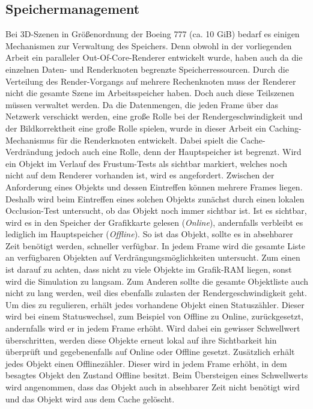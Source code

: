 \subsection{Speichermanagement}
\label{sec:basics:speicher}
Bei 3D-Szenen in Größenordnung der Boeing 777 (ca. 10 GiB) bedarf es einigen Mechanismen zur Verwaltung des Speichers. Denn obwohl in der vorliegenden Arbeit ein paralleler Out-Of-Core-Renderer entwickelt wurde, haben auch da die einzelnen Daten- und Renderknoten begrenzte Speicherressourcen. Durch die Verteilung des Render-Vorgangs auf mehrere Rechenknoten muss der Renderer nicht die gesamte Szene im Arbeitsspeicher haben. Doch auch diese Teilszenen müssen verwaltet werden. Da die Datenmengen, die jeden Frame über das Netzwerk verschickt werden, eine große Rolle bei der Rendergeschwindigkeit und der Bildkorrektheit eine große Rolle spielen, wurde in dieser Arbeit ein Caching-Mechanismus für die Renderknoten entwickelt. Dabei spielt die Cache-Verdrändung jedoch auch eine Rolle, denn der Hauptspeicher ist begrenzt. Wird ein Objekt im Verlauf des Frustum-Tests als sichtbar markiert, welches noch nicht auf dem Renderer vorhanden ist, wird es angefordert. Zwischen der Anforderung eines Objekts und dessen Eintreffen können mehrere Frames liegen. Deshalb wird beim Eintreffen eines solchen Objekts zunächst durch einen lokalen Occlusion-Test untersucht, ob das Objekt noch immer sichtbar ist. Ist es sichtbar, wird es in den Speicher der Grafikkarte gelesen (\textit{Online}), andernfalls verbleibt es lediglich im Hauptspeicher (\textit{Offline}). So ist das Objekt, sollte es in absehbarer Zeit benötigt werden, schneller verfügbar. In jedem Frame wird die gesamte Liste an verfügbaren Objekten auf Verdrängungsmöglichkeiten untersucht. Zum einen ist darauf zu achten, dass nicht zu viele Objekte im Grafik-RAM liegen, sonst wird die Simulation zu langsam. Zum Anderen sollte die gesamte Objektliste auch nicht zu lang werden, weil dies ebenfalls zulasten der Rendergeschwindigkeit geht.\\
Um dies zu regulieren, erhält jedes vorhandene Objekt einen Statuszähler. Dieser wird bei einem Statuswechsel, zum Beispiel von Offline zu Online, zurückgesetzt, andernfalls wird er in jedem Frame erhöht. Wird dabei ein gewisser Schwellwert überschritten, werden diese Objekte erneut lokal auf ihre Sichtbarkeit hin überprüft und gegebenenfalls auf Online oder Offline gesetzt. Zusätzlich erhält jedes Objekt einen Offlinezähler. Dieser wird in jedem Frame erhöht, in dem besagtes Objekt den Zustand Offline besitzt. Beim Übersteigen eines Schwellwerts wird angenommen, dass das Objekt auch in absehbarer Zeit nicht benötigt wird und das Objekt wird aus dem Cache gelöscht.
